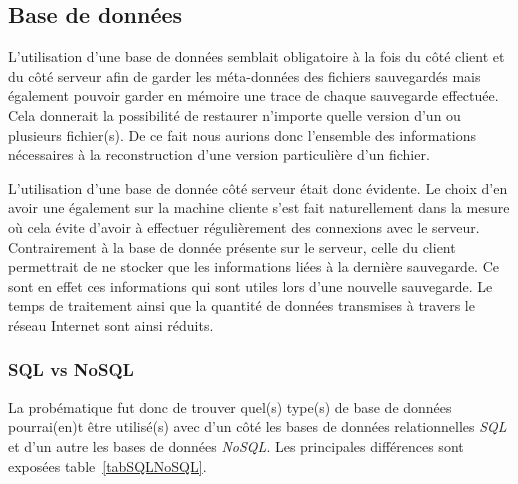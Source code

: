 \documentclass[a4paper,10pt, twoside]{report}
\begin{document}
\begin{spacing}{1.2}
\subsection{Base de données}

L'utilisation d'une base de données semblait obligatoire à la fois du côté
client et du côté serveur afin de garder les méta-données des fichiers
sauvegardés mais également pouvoir garder en mémoire une trace de chaque
sauvegarde effectuée. Cela donnerait la possibilité de restaurer n'importe
quelle version d'un ou plusieurs fichier(s). De ce fait nous aurions donc
l'ensemble des informations nécessaires à la reconstruction d'une version
particulière d'un fichier.

L'utilisation d'une base de donnée côté serveur était donc évidente. Le choix
d'en avoir une également sur la machine cliente s'est fait naturellement dans
la mesure où cela évite d'avoir à effectuer régulièrement des connexions avec
le serveur. Contrairement à la base de donnée présente sur le serveur, celle
du client permettrait de ne stocker que les informations liées à la dernière
sauvegarde. Ce sont en effet ces informations qui sont utiles lors d'une
nouvelle sauvegarde. Le temps de traitement ainsi que la quantité de données
transmises à travers le réseau Internet sont ainsi réduits.

\subsubsection{SQL vs NoSQL}

La probématique fut donc de trouver quel(s) type(s) de base de données
pourrai(en)t être utilisé(s) avec d'un côté les bases de données relationnelles
\textit{SQL} et d'un autre les bases de données \textit{NoSQL}. Les principales
différences sont exposées table~\ref{tabSQLNoSQL}.


\end{spacing}
\end{document}
